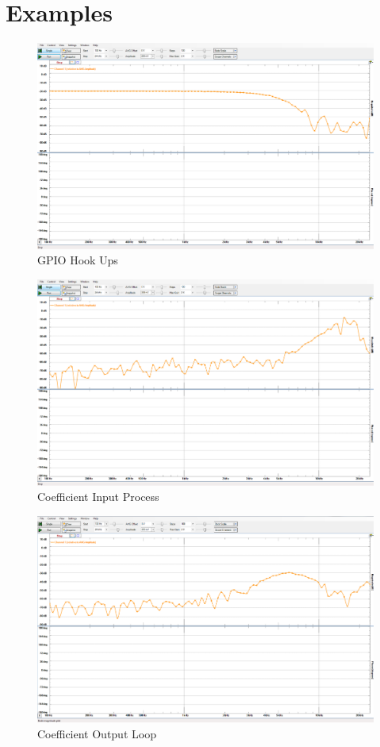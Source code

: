 \documentclass[12pt,a4paper,titlepage]{article}
\begin{document}
\newpage

\section{Examples}
\begin{figure}[!htb]
  \centering
  \includegraphics[width=\textwidth]
                  {../presentation/lowpass-final.png}
                  \caption{GPIO Hook Ups}
                  \label{fig:c0}
\end{figure}
\begin{figure}[!htb]
  \centering
  \includegraphics[width=\textwidth]
                  {../presentation/highpass-final.png}
                  \caption{Coefficient Input Process}
                  \label{fig:c1}
\end{figure}
\begin{figure}[!htb]
  \centering
  \includegraphics[width=\textwidth]
                  {../presentation/bandpass-final.png}
                  \caption{Coefficient Output Loop}
                  \label{fig:c2}
\end{figure}


\end{document}
